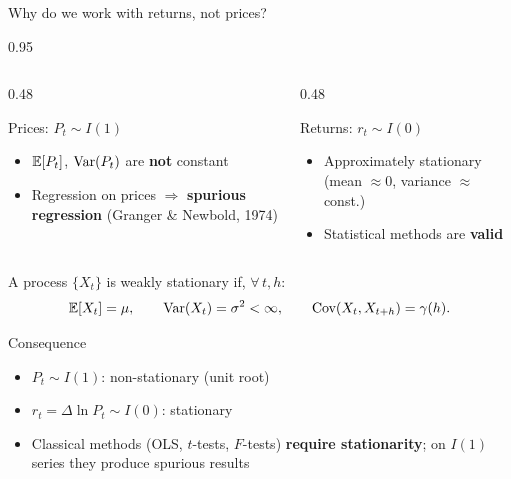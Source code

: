 \documentclass[9pt, aspectratio=169, t]{beamer}
\begin{document}
\begin{frame}[shrink=10]{Why do we work with returns, not prices?}
    \begin{cminipage}{0.95\textwidth}
    \begin{columns}[T]
    \begin{column}{0.48\textwidth}
    \begin{alertblock}{Prices: $P_t \sim I(1)$}
    \begin{itemize}\setlength{\itemsep}{0pt}
        \item $\mathbb{E}[P_t]$, $\text{Var}(P_t)$ are \textbf{not} constant
        \item Regression on prices $\Rightarrow$ \textbf{spurious regression} (Granger \& Newbold, 1974)
    \end{itemize}
    \end{alertblock}
    \end{column}
    \begin{column}{0.48\textwidth}
    \begin{exampleblock}{Returns: $r_t \sim I(0)$}
    \begin{itemize}\setlength{\itemsep}{0pt}
        \item Approximately stationary (mean $\approx 0$, variance $\approx$ const.)
        \item Statistical methods are \textbf{valid}
    \end{itemize}
    \end{exampleblock}
    \end{column}
    \end{columns}
    \vspace{0.1cm}
    \begin{defn}
    A process $\{X_t\}$ is weakly stationary if, $\forall\, t, h$:
    \[
    \mathbb{E}[X_t] = \mu, \qquad \text{Var}(X_t) = \sigma^2 < \infty, \qquad \text{Cov}(X_t, X_{t+h}) = \gamma(h).
    \]
    \end{defn}
    \vspace{0.1cm}
    \begin{block}{Consequence}
    \begin{itemize}\setlength{\itemsep}{0pt}
        \item $P_t \sim I(1)$: non-stationary (unit root)
        \item $r_t = \Delta \ln P_t \sim I(0)$: stationary
        \item Classical methods (OLS, $t$-tests, $F$-tests) \textbf{require stationarity}; on $I(1)$ series they produce spurious results
    \end{itemize}
    \end{block}
    \end{cminipage}
\end{frame}
\end{document}
